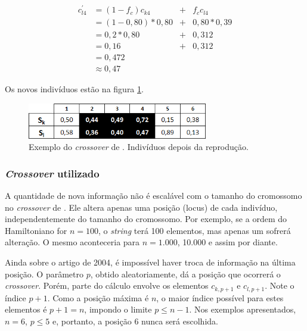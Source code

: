 	
	\begin{equation}
		\begin{array}{llcl}
			c^{'}_{l4}	& = (1 - f_c) c_{k4} 		& + & f_c c_{l4} \\
									& = (1 - 0,80) * 0,80		& + &	0,80 * 0,39 \\
									& = 0,2 * 0,80					& + & 0,312	\\
									& = 0,16								& + & 0,312	\\
									& = 0,472 \\
									& \approx 0,47
		\end{array}
	\end{equation}
	
	Os novos indivíduos estão na figura \ref{fig:cross2011_tabelaDepois}.
		
	\begin{figure}[htbp]
	\centering
		\includegraphics[width=0.70\textwidth]{figs/materiais_metodo/autovalores_com_ga/cross2011_tabelaDepois.png}
	\caption{Exemplo do \emph{crossover} de \cite{metodo2011}. Indivíduos depois da reprodução.}
	\label{fig:cross2011_tabelaDepois}
\end{figure}
	
	
\subsubsection{\emph{Crossover} utilizado}	

	A quantidade de nova informação não é escalável com o tamanho do cromossomo no \emph{crossover} de \cite{metodo2004}. Ele altera apenas uma posição (locus) de cada indivíduo, independentemente do tamanho do cromossomo. Por exemplo, se a ordem do Hamiltoniano for $n = 100$, o \emph{string} terá 100 elementos, mas apenas um sofrerá alteração. O mesmo aconteceria para $n = 1.000$, 10.000 e assim por diante.
	
	Ainda sobre o artigo de 2004, é impossível haver troca de informação na última posição. O parâmetro $p$, obtido aleatoriamente, dá a posição que ocorrerá o \emph{crossover}. Porém, parte do cálculo envolve os elementos $c_{k,p+1}$ e $c_{l,p+1}$. Note o índice $p+1$. Como a posição máxima é $n$, o maior índice possível para estes elementos é $p + 1 = n$, impondo o limite $p \leq n - 1$. Nos exemplos apresentados, $n = 6$, $p \leq 5$ e, portanto, a posição $6$ nunca será escolhida.
	
